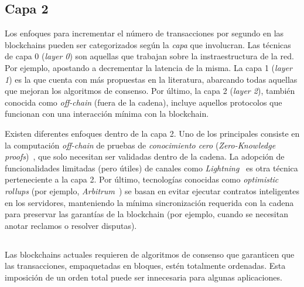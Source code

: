 

\subsection{Capa 2}
Los enfoques para incrementar el número de transacciones por segundo en las blockchains pueden
ser categorizados según la \emph{capa} que involucran.
%
Las técnicas de capa 0 (\textit{layer 0}) son aquellas que trabajan sobre la instraestructura de la red.
%
Por ejemplo, apostando a decrementar la latencia de la misma.
% 
La capa 1 (\textit{layer 1}) es la que cuenta con más propuestas en la literatura, abarcando todas aquellas que
mejoran los algoritmos de consenso.
%
Por último, la capa 2 (\textit{layer 2}), también conocida como \emph{off-chain} (fuera de la cadena),
incluye aquellos protocolos que funcionan con una interacción mínima con la
blockchain\cite{Jourenko2019SoKAT}.

Existen diferentes enfoques dentro de la capa 2.
%
Uno de los principales consiste en la computación \emph{off-chain} de pruebas de \emph{conocimiento cero}
(\emph{Zero-Knowledge proofs})~\cite{Sasson2014ZKvonNeumann}, que solo necesitan ser validadas dentro de la cadena.
%
La adopción de funcionalidades limitadas (pero útiles) de canales como \emph{Lightning}~\cite{Poon2016lightning}
es otra técnica perteneciente a la capa 2.
%
Por último, tecnologías conocidas como \emph{optimistic rollups} (por ejemplo, \emph{Arbitrum}~\cite{Kalodner2018Arbitrum})
se basan en evitar ejecutar contratos inteligentes
en los servidores, manteniendo la mínima sincronización requerida con la cadena para preservar las garantías
de la blockchain (por ejemplo, cuando se necesitan anotar reclamos o resolver disputas).

\subsection{\setchain}
Las blockchains actuales requieren de algoritmos de consenso que garanticen que las
transacciones, empaquetadas en bloques, estén totalmente ordenadas.
%
Esta imposición de un orden total puede ser innecesaria para algunas aplicaciones.


